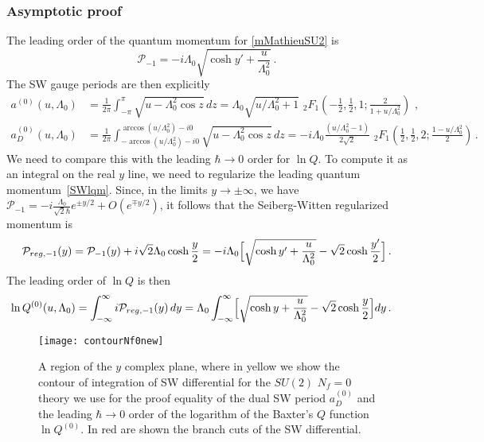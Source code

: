 \documentclass[11pt,a4paper]{elsarticle}
\def \h {\hbar}
\def \CP {\mathcal{P}}
\newcommand{\be}{\begin{equation}}
\newcommand{\ee}{\end{equation}}
\def\h{\hbar}
\numberwithin{figure}{section}
\numberwithin{table}{section}
\begin{document}
\subsubsection{Asymptotic proof}




The leading order of the quantum momentum for \eqref{mMathieuSU2} is
\be \label{SWlqm}
\CP_{-1}=-i \Lambda_0   \sqrt{ \cosh{y'}+\frac{u}{\Lambda_0^2}} \, .
\ee
The SW gauge periods are then explicitly
\begin{align}
 a^{(0)}(u, \Lambda_0)
&=\frac{1}{2 \pi} \int_{-\pi}^{\pi} \sqrt{u-\Lambda_0^2 \cos{z} } \, dz =\Lambda_0\sqrt{ u/\Lambda_0^2+1}\,\, {}_2F_1(-\frac{1}{2},\frac{1}{2},1;\frac{2}{1+u/\Lambda_0^2}) \,\, , \label{a0}  \\
 a^{(0)}_D(u, \Lambda_0)
&= \frac{1}{2\pi} \int_{- \arccos(u/\Lambda_0^2)-i0}^{ \arccos(u/\Lambda_0^2)-i0} \sqrt{u-\Lambda_0^2 \cos{z} } \, dz    =  - i \Lambda_0 \frac{(u/\Lambda_0^2-1)}{2\sqrt{2}} \,\, {}_2F_1(\frac{1}{2},\frac{1}{2},2;\frac{1-u/\Lambda_0^2}{2})  \, . \label{a0D} 
\end{align}
We need to compare this with the leading $\hbar \to 0$ order for $\ln Q$. To compute it as an integral on the real $y$ line, we need to regularize the leading quantum momentum~\eqref{SWlqm}. Since, in the limits $y \to \pm \infty$, we have $\CP_{-1} = - i \frac{\Lambda_0}{\sqrt{2}\h} e^{\pm y/2}+ O(e^{\mp y/2})$, it follows that the Seiberg-Witten regularized momentum is
\be
\CP_{reg,-1}(y)= \CP_{-1}(y) +  i \sqrt{2}\Lambda_0 \cosh \frac{y}{2}   =-i \Lambda_0 \Bigl [  \sqrt{  \cosh{y'}+ \frac{u}{\Lambda_0^2}} - \sqrt{2} \cosh \frac{y'}{2} \Bigr] \,.
\label{Preg-1}
\ee 
The leading order of $\ln Q$ is then~\cite{FioravantiGregori:2019}
\begin{align}
\ln{Q}^{(0)}( u,\Lambda_0) &=\int_{-\infty}^\infty i \CP_{reg,-1}(y) \,dy=  \Lambda_0 \int_{-\infty}^\infty  \Bigl [  \sqrt{  \cosh{y}+ \frac{u}{\Lambda_0^2}} - \sqrt{2} \cosh \frac{y}{2} \Bigr] dy \,.    \label{QSWreg} 
\end{align}
\begin{figure}[t]
\centering
\texttt{[image: contourNf0new]}%
\caption{A region of the $y$ complex plane, where in yellow we show the contour of integration of SW differential for the $SU(2)$ $N_f=0$ theory we use for the proof equality of the dual SW period $a_D^{(0)}$ and the leading $\hbar \to 0 $ order of the logarithm of the Baxter's $Q$ function $\ln Q^{(0)}$. In red are shown the branch cuts of the SW differential.}\label{figcontourNf=0}
\end{figure}
\end{document}
